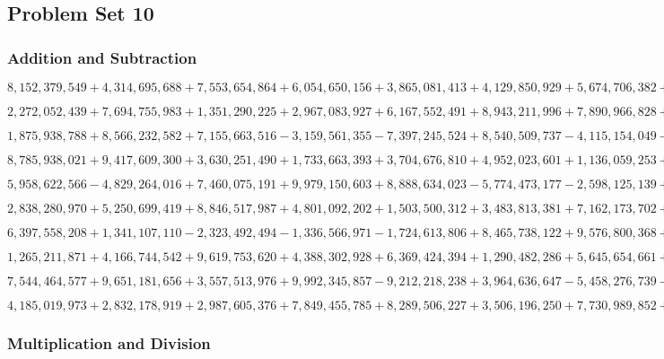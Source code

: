 \hypertarget{problem-set-10-6}{%
\subsection{Problem Set 10}\label{problem-set-10-6}}

\hypertarget{addition-and-subtraction-390}{%
\subsubsection{Addition and
Subtraction}\label{addition-and-subtraction-390}}

\(8,152,379,549+4,314,695,688+7,553,654,864+6,054,650,156+3,865,081,413+4,129,850,929+5,674,706,382+4,244,682,623+1,985,462,619+6,219,139,743\)

\(2,272,052,439+7,694,755,983+1,351,290,225+2,967,083,927+6,167,552,491+8,943,211,996+7,890,966,828+9,083,849,341+3,892,984,189+5,391,522,166\)

\(1,875,938,788+8,566,232,582+7,155,663,516-3,159,561,355-7,397,245,524+8,540,509,737-4,115,154,049-5,777,540,453+4,822,419,407+5,749,178,794\)

\(8,785,938,021+9,417,609,300+3,630,251,490+1,733,663,393+3,704,676,810+4,952,023,601+1,136,059,253+7,660,109,349+1,912,742,177+8,650,552,889\)

\(5,958,622,566-4,829,264,016+7,460,075,191+9,979,150,603+8,888,634,023-5,774,473,177-2,598,125,139+9,119,267,265-6,357,193,208+2,408,567,142\)

\(2,838,280,970+5,250,699,419+8,846,517,987+4,801,092,202+1,503,500,312+3,483,813,381+7,162,173,702+2,461,550,124+9,890,460,690+3,666,093,033\)

\(6,397,558,208+1,341,107,110-2,323,492,494-1,336,566,971-1,724,613,806+8,465,738,122+9,576,800,368+9,563,344,856+1,418,335,954-4,864,946,999\)

\(1,265,211,871+4,166,744,542+9,619,753,620+4,388,302,928+6,369,424,394+1,290,482,286+5,645,654,661+1,213,290,342+5,586,528,070+4,293,939,245\)

\(7,544,464,577+9,651,181,656+3,557,513,976+9,992,345,857-9,212,218,238+3,964,636,647-5,458,276,739-1,203,065,150-6,066,090,111+3,006,384,154\)

\(4,185,019,973+2,832,178,919+2,987,605,376+7,849,455,785+8,289,506,227+3,506,196,250+7,730,989,852+5,598,621,916+9,394,887,694+3,739,701,497\)

\hypertarget{multiplication-and-division-388}{%
\subsubsection{Multiplication and
Division}\label{multiplication-and-division-388}}

